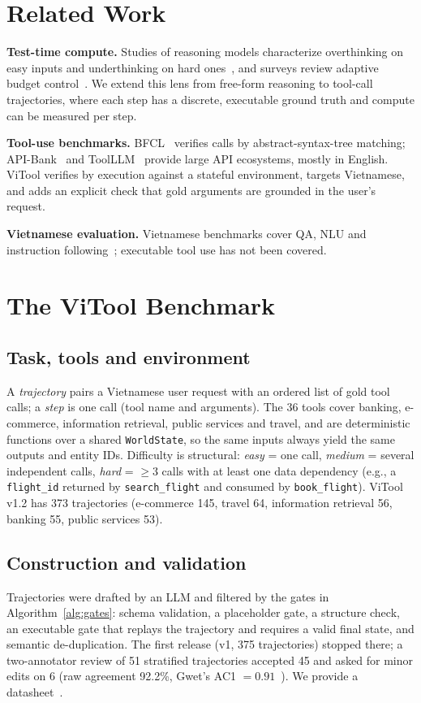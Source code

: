 \documentclass[conference,a4paper]{IEEEtran}
\begin{document}
\section{Related Work}
\textbf{Test-time compute.} Studies of reasoning models characterize
overthinking on easy inputs and underthinking on hard
ones~\cite{chen2024overthink,wang2025underthink,sui2025survey}, and surveys
review adaptive budget control~\cite{ttcsurvey2025}. We extend this lens from
free-form reasoning to tool-call trajectories, where each step has a discrete,
executable ground truth and compute can be measured per step.

\textbf{Tool-use benchmarks.} BFCL~\cite{bfcl2024} verifies calls by
abstract-syntax-tree matching; API-Bank~\cite{apibank2023} and
ToolLLM~\cite{toolbench2023} provide large API ecosystems, mostly in English.
ViTool verifies by execution against a stateful environment, targets
Vietnamese, and adds an explicit check that gold arguments are grounded in the
user's request.

\textbf{Vietnamese evaluation.} Vietnamese benchmarks cover QA, NLU and
instruction following~\cite{villmeval2024,viglue2024,crossing2024}; executable
tool use has not been covered.

\section{The ViTool Benchmark}

\subsection{Task, tools and environment}
A \emph{trajectory} pairs a Vietnamese user request with an ordered list of
gold tool calls; a \emph{step} is one call (tool name and arguments). The 36
tools cover banking, e-commerce, information retrieval, public services and
travel, and are deterministic functions over a shared \texttt{WorldState}, so
the same inputs always yield the same outputs and entity IDs. Difficulty is
structural: \emph{easy} = one call, \emph{medium} = several independent calls,
\emph{hard} = $\geq 3$ calls with at least one data dependency (e.g., a
\texttt{flight\_id} returned by \texttt{search\_flight} and consumed by
\texttt{book\_flight}). ViTool v1.2 has 373 trajectories (e-commerce 145,
travel 64, information retrieval 56, banking 55, public services 53).

\subsection{Construction and validation}
Trajectories were drafted by an LLM and filtered by the gates in
Algorithm~\ref{alg:gates}: schema validation, a placeholder gate,
a structure check, an executable gate that replays the trajectory and requires
a valid final state, and semantic de-duplication. The first release (v1, 375
trajectories) stopped there; a two-annotator review of 51 stratified
trajectories accepted 45 and asked for minor edits on 6 (raw agreement 92.2\%,
Gwet's AC1 $=0.91$~\cite{gwet2008}). We provide a datasheet~\cite{datasheets2021}.
\end{document}
